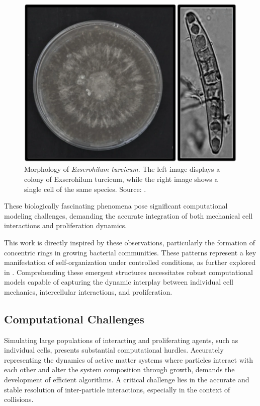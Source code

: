 \documentclass[conference]{IEEEtran}
\begin{document}
\begin{figure}
    \centering
    \includegraphics[width=\linewidth]{figures/real-bacteria/Exserohilum turcicum.png}
    \caption{Morphology of \textit{Exserohilum turcicum}. The left image displays a colony of Exserohilum turcicum, while the right image shows a single cell of the same species. Source: \cite{Bankole2023}.}
    \label{fig:exserohilum_turcicum}
\end{figure}

These biologically fascinating phenomena pose significant computational modeling challenges, demanding the accurate integration of both mechanical cell interactions and proliferation dynamics.

This work is directly inspired by these observations, particularly the formation of concentric rings in growing bacterial communities. These patterns represent a key manifestation of self-organization under controlled conditions, as further explored in \cite{Weady2024}. Comprehending these emergent structures necessitates robust computational models capable of capturing the dynamic interplay between individual cell mechanics, intercellular interactions, and proliferation.

\subsection{Computational Challenges}

Simulating large populations of interacting and proliferating agents, such as individual cells, presents substantial computational hurdles. Accurately representing the dynamics of active matter systems where particles interact with each other and alter the system composition through growth, demands the development of efficient algorithms. A critical challenge lies in the accurate and stable resolution of inter-particle interactions, especially in the context of collisions.
\end{document}
